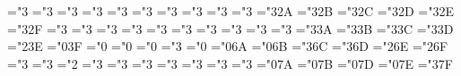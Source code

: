 \mathchardef\varsubsetneq="3
\mathchardef\varsupsetneq="3
\mathchardef\nsubseteqq="3
\mathchardef\nsupseteqq="3
\mathchardef\subsetneqq="3
\mathchardef\supsetneqq="3
\mathchardef\varsubsetneqq="3
\mathchardef\varsupsetneqq="3
\mathchardef\subsetneq="3
\mathchardef\supsetneq="3
\mathchardef\nsubseteq="3\@ym2A
\mathchardef\nsupseteq="3\@ym2B
\mathchardef\nparallel="3\@ym2C
\mathchardef\nmid="3\@ym2D
\mathchardef\nshortmid="3\@ym2E
\mathchardef\nshortparallel="3\@ym2F
\mathchardef\nvdash="3
\mathchardef\nVdash="3
\mathchardef\nvDash="3
\mathchardef\nVDash="3
\mathchardef\ntrianglerighteq="3
\mathchardef\ntrianglelefteq="3
\mathchardef\ntriangleleft="3
\mathchardef\ntriangleright="3
\mathchardef\nleftarrow="3
\mathchardef\nrightarrow="3
\mathchardef\nLeftarrow="3\@ym3A
\mathchardef\nRightarrow="3\@ym3B
\mathchardef\nLeftrightarrow="3\@ym3C
\mathchardef\nleftrightarrow="3\@ym3D
\mathchardef\divideontimes="2\@ym3E
\mathchardef\varnothing="0\@ym3F
\mathchardef\nexists="0
\mathchardef\mho="0
\mathchardef\eth="0
\mathchardef\eqsim="3
\mathchardef\beth="0
\mathchardef\gimel="0\@ym6A
\mathchardef\daleth="0\@ym6B
\mathchardef\lessdot="3\@ym6C
\mathchardef\gtrdot="3\@ym6D
\mathchardef\ltimes="2\@ym6E
\mathchardef\rtimes="2\@ym6F
\mathchardef\shortmid="3
\mathchardef\shortparallel="3
\mathchardef\smallsetminus="2
\mathchardef\thicksim="3
\mathchardef\thickapprox="3
\mathchardef\approxeq="3
\mathchardef\succapprox="3
\mathchardef\precapprox="3
\mathchardef\curvearrowleft="3
\mathchardef\curvearrowright="3
\mathchardef\digamma="0\@ym7A
\mathchardef\varkappa="0\@ym7B
\mathchardef\hslash="0\@ym7D
\mathchardef\hbar="0\@ym7E
\mathchardef\backepsilon="3\@ym7F


\def\Bbb{\ifmmode\let\next\Bbb@\else
\def\next{\errmessage{Use \string\Bbb\space only in math mode}}\fi\next}
\def\Bbb@#1{{\Bbb@@{#1}}}
\def\Bbb@@#1{\fam\ymfam#1}
%
\fi



\def\Nulle{0} %
\def\Afe{1}   %
\def\Hae{2}   %
\def\Hbe{3}   %
\def\Hce{4}   %
\def\Hde{5}   %



\newcount\LastMac       \LastMac=\Nulle


